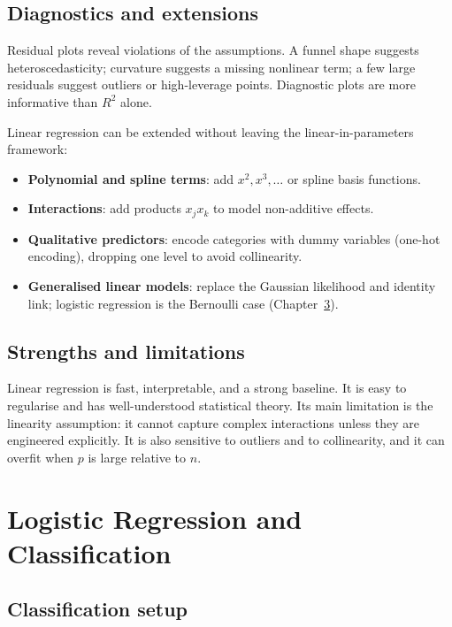 \documentclass[a4paper, 12pt]{book}
\begin{document}
\section{Diagnostics and extensions}

Residual plots reveal violations of the assumptions. A funnel shape suggests
heteroscedasticity; curvature suggests a missing nonlinear term; a few large residuals
suggest outliers or high-leverage points. Diagnostic plots are more informative than
$R^2$ alone.

Linear regression can be extended without leaving the linear-in-parameters
framework:
\begin{itemize}
    \item \textbf{Polynomial and spline terms}: add $x^2, x^3, \ldots$ or spline basis
    functions.
    \item \textbf{Interactions}: add products $x_j x_k$ to model non-additive effects.
    \item \textbf{Qualitative predictors}: encode categories with dummy variables
    (one-hot encoding), dropping one level to avoid collinearity.
    \item \textbf{Generalised linear models}: replace the Gaussian likelihood and
    identity link; logistic regression is the Bernoulli case
    (Chapter~\ref{ch:logistic}).
\end{itemize}

\section{Strengths and limitations}

Linear regression is fast, interpretable, and a strong baseline. It is easy to
regularise and has well-understood statistical theory. Its main limitation is the
linearity assumption: it cannot capture complex interactions unless they are
engineered explicitly. It is also sensitive to outliers and to collinearity, and it
can overfit when $p$ is large relative to $n$.


\chapter{Logistic Regression and Classification}
\label{ch:logistic}

\section{Classification setup}
\end{document}
